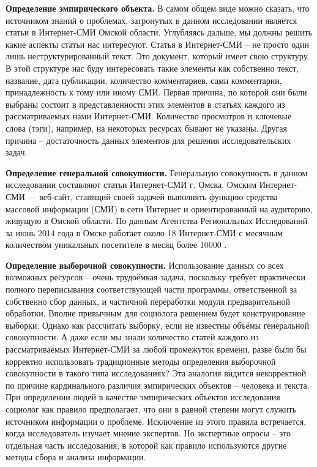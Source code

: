 \textbf{Определение эмпирического объекта.} В самом общем виде можно сказать, что источником знаний о проблемах, затронутых в данном исследовании является статьи в Интернет-СМИ Омской области. Углубляясь дальше, мы должны решить какие аспекты статьи нас интересуют. Статья в Интернет-СМИ -- не просто один лишь неструктурированный текст. Это документ, который имеет свою структуру. В этой структуре нас буду интересовать такие элементы как собственно текст, название, дата публикации, количество комментариев, сами комментарии, принадлежность к тому или иному СМИ. Первая причина, по которой они были выбраны состоит в представленности этих элементов в статьях каждого из рассматриваемых нами Интернет-СМИ. Количество просмотров и ключевые слова (тэги), например, на некоторых ресурсах бывают не указаны. Другая причина -- достаточность данных элементов для решения исследовательских задач.

\textbf{Определение генеральной совокупности.} Генеральную совокупность в данном исследовании составляют статьи Интернет-СМИ г. Омска. Омским Интернет-СМИ — веб-сайт, ставящий своей задачей выполнять функцию средства массовой информации (СМИ) в сети Интернет и ориентированный на аудиторию, живущую в Омской области. По данным Агентства Региональных Исследований за июнь 2014 года в Омске работает около 18 Интернет-СМИ с месячным количеством уникальных посетителе в месяц более 10000 \cite{ari_rating}. 

\textbf{Определение выборочной совокупности.} Использование данных со всех возможных ресурсов -- очень трудоёмкая задача, поскольку требует практически полного переписывания соответствующей части программы, ответственной за собственно сбор данных, и частичной переработки модуля предварительной обработки. Вполне привычным для социолога решением будет конструирование выборки. Однако как рассчитать выборку, если не известны объёмы генеральной совокупности. А даже если мы знали количество статей каждого из рассматриваемых Интернет-СМИ за любой промежуток времени, разве было бы корректно использовать традиционные методы определения выборочной совокупности в такого типа исследованиях? Эта аналогия видится некорректной по причине кардинального различия эмпирических объектов -- человека и текста. При определении людей в качестве эмпирических объектов исследования социолог как правило предполагает, что они в равной степени могут служить источником информации о проблеме. Исключение из этого правила встречается, когда исследователь изучает мнение экспертов. Но экспертные опросы -- это отдельная часть исследования, в которой как правило используются другие методы сбора и анализа информации.

